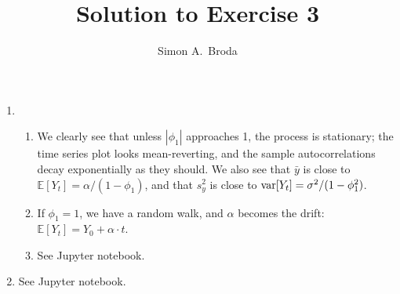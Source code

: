 \documentclass[11pt, a4paper]{article}
\newcommand{\E}{\ensuremath{{\mathbb E}}} %
\def\func#1{\mathop{\rm #1}}
\begin{document}
\title{Solution to Exercise 3}
\author{Simon A.\ Broda}
\date{}
\maketitle
\begin{enumerate}
\item
\begin{enumerate}
\item We clearly see that unless $|\phi_1|$ approaches 1, the process is stationary; the time series plot looks mean-reverting, and the sample autocorrelations decay exponentially as they should. We also see that $\bar y$ is close to $\E[Y_t]=\alpha/(1-\phi_1)$, and that $s^2_y$ is close to $\func{var}[Y_t]=\sigma^2/(1-\phi_1^2)$.
\item If $\phi_1=1$, we have a random walk, and $\alpha$ becomes the drift: $\E[Y_t]=Y_0+\alpha\cdot t$.
\item See Jupyter notebook.
\end{enumerate}
\item See Jupyter notebook.


\end{enumerate}
\end{document}
